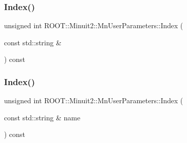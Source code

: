 \subsubsection{\texorpdfstring{Index()}{Index()}\hspace{0.1cm}{\footnotesize\ttfamily [1/2]}}
{\footnotesize\ttfamily unsigned int R\+O\+O\+T\+::\+Minuit2\+::\+Mn\+User\+Parameters\+::\+Index (\begin{DoxyParamCaption}\item[{const std\+::string \&}]{ }\end{DoxyParamCaption}) const}

\mbox{\label{classROOT_1_1Minuit2_1_1MnUserParameters_a30523af61ec1c817b0eb060d560f9a95}} 
\subsubsection{\texorpdfstring{Index()}{Index()}\hspace{0.1cm}{\footnotesize\ttfamily [2/2]}}
{\footnotesize\ttfamily unsigned int R\+O\+O\+T\+::\+Minuit2\+::\+Mn\+User\+Parameters\+::\+Index (\begin{DoxyParamCaption}\item[{const std\+::string \&}]{name }\end{DoxyParamCaption}) const}

